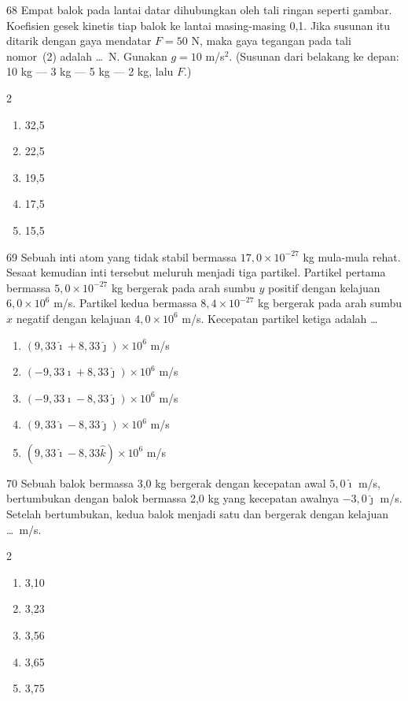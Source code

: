 \documentclass[11pt]{article}
\newenvironment{pil}{%
  \begin{enumerate}[label=(\Alph*),leftmargin=*,itemsep=1pt,topsep=3pt]}%
  {\end{enumerate}}
\newenvironment{pilB}{%
  \par\smallskip\begin{multicols}{2}
  \begin{enumerate}[label=(\Alph*),leftmargin=*,itemsep=1pt,topsep=3pt]}%
  {\end{enumerate}\end{multicols}}
\begin{document}
\begin{soal}{68}
Empat balok pada lantai datar dihubungkan oleh tali ringan seperti gambar.
Koefisien gesek kinetis tiap balok ke lantai masing-masing 0,1. Jika
susunan itu ditarik dengan gaya mendatar $F=50$ N, maka gaya tegangan
pada tali nomor~(2) adalah \ldots\ N. Gunakan $g=10$ m/s$^2$. (Susunan
dari belakang ke depan: 10 kg --- 3 kg --- 5 kg --- 2 kg, lalu $F$.)
\begin{pilB}
  \item 32,5 \item 22,5 \item 19,5 \item 17,5 \item 15,5
\end{pilB}
\end{soal}

\begin{soal}{69}
Sebuah inti atom yang tidak stabil bermassa $17{,}0\times10^{-27}$ kg
mula-mula rehat. Sesaat kemudian inti tersebut meluruh menjadi tiga
partikel. Partikel pertama bermassa $5{,}0\times10^{-27}$ kg bergerak
pada arah sumbu $y$ positif dengan kelajuan $6{,}0\times10^{6}$ m/s.
Partikel kedua bermassa $8{,}4\times10^{-27}$ kg bergerak pada arah
sumbu $x$ negatif dengan kelajuan $4{,}0\times10^{6}$ m/s. Kecepatan
partikel ketiga adalah \ldots
\begin{pil}
  \item $(9{,}33\hat{\imath}+8{,}33\hat{\jmath})\times10^6$ m/s
  \item $(-9{,}33\hat{\imath}+8{,}33\hat{\jmath})\times10^6$ m/s
  \item $(-9{,}33\hat{\imath}-8{,}33\hat{\jmath})\times10^6$ m/s
  \item $(9{,}33\hat{\imath}-8{,}33\hat{\jmath})\times10^6$ m/s
  \item $(9{,}33\hat{\imath}-8{,}33\hat{k})\times10^6$ m/s
\end{pil}
\end{soal}

\begin{soal}{70}
Sebuah balok bermassa 3,0 kg bergerak dengan kecepatan awal
$5{,}0\hat{\imath}$ m/s, bertumbukan dengan balok bermassa 2,0 kg yang
kecepatan awalnya $-3{,}0\hat{\jmath}$ m/s. Setelah bertumbukan, kedua
balok menjadi satu dan bergerak dengan kelajuan \ldots\ m/s.
\begin{pilB}
  \item 3,10 \item 3,23 \item 3,56 \item 3,65 \item 3,75
\end{pilB}
\end{soal}
\end{document}
